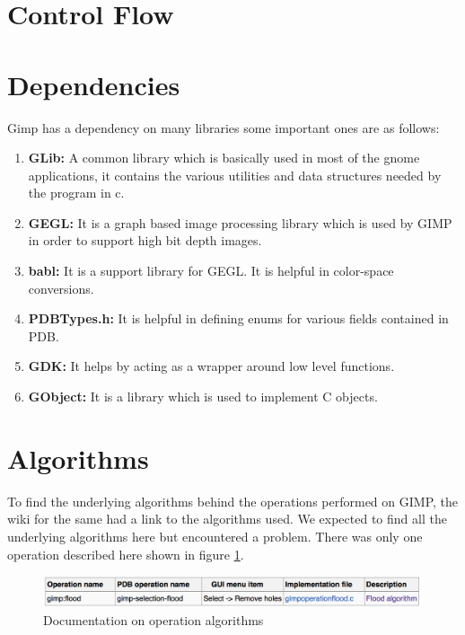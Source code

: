 \section{Control Flow}
\section{Dependencies}
Gimp has a dependency on many libraries some important ones are as follows:
\begin{enumerate}
\item \textbf{GLib:} \newline
A common library which is basically used in most of the gnome applications, it contains the various utilities and data structures needed by the program in c.
\item \textbf{GEGL:} \newline
It is a graph based image processing library which is used by GIMP in order to support high bit depth images.
\item \textbf{babl:} \newline
It is a support library for GEGL. It is helpful in color-space conversions.
\item \textbf{PDBTypes.h:} \newline
It is helpful in defining enums for various fields contained in PDB.
\item \textbf{GDK:} \newline
It helps by acting as a wrapper around low level functions.
\item \textbf{GObject:} \newline
It is a library which is used to implement C objects.
\end{enumerate}

\section{Algorithms}
To find the underlying algorithms behind the operations performed on GIMP, the wiki for the same had a link to the algorithms used. We expected to find all the underlying algorithms here but encountered a problem. There was only one operation described here shown in figure \ref{fig:algorithm}.

\begin{figure}
\centering
\includegraphics[width=1\textwidth]{algorithm.png}
\caption{\label{fig:algorithm}Documentation on operation algorithms}
\end{figure}

